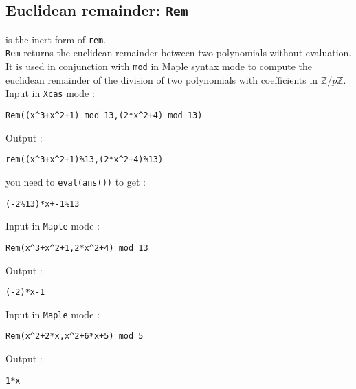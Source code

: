 \documentclass[a4paper,11pt]{book}
\newcommand{\Z}{{\mathbb{Z}}}
\begin{document}
\subsection{Euclidean remainder: {\tt Rem}}
 is the inert form of {\tt rem}.\\
{\tt Rem} returns the euclidean remainder between two polynomials
without evaluation. 
It is used in conjunction with {\tt mod} in Maple syntax mode to compute
the euclidean remainder of the division of two
polynomials with coefficients in $\Z/p\Z$.\\
Input in {\tt Xcas} mode :
\begin{center}{\tt Rem((x\verb|^|3+x\verb|^|2+1) mod 13,(2*x\verb|^|2+4) mod 13)}\end{center}
Output :
\begin{center}{\tt rem((x\verb|^|3+x\verb|^|2+1)\%13,(2*x\verb|^|2+4)\%13)}\end{center}
you need to {\tt eval(ans())} to get :
\begin{center}{\tt (-2\%13)*x+-1\%13}\end{center}
Input in {\tt Maple} mode :
\begin{center}{\tt Rem(x\verb|^|3+x\verb|^|2+1,2*x\verb|^|2+4) mod 13}\end{center}
Output :
\begin{center}{\tt (-2)*x-1}\end{center}
Input in {\tt Maple} mode :
\begin{center}{\tt Rem(x\verb|^|2+2*x,x\verb|^|2+6*x+5) mod 5}\end{center}
Output :
\begin{center}{\tt 1*x}\end{center}
\end{document}
